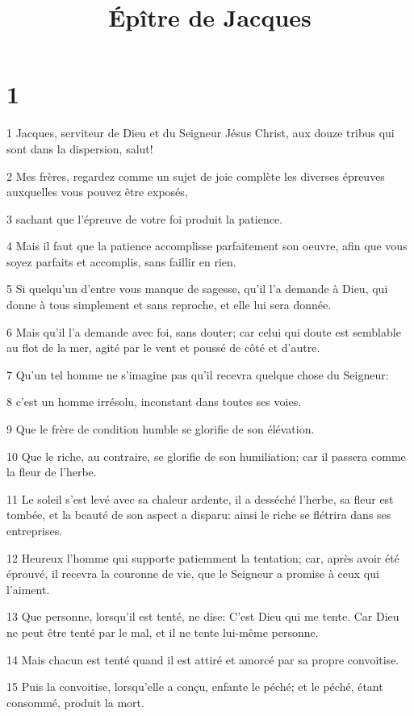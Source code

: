 

\title{Épître de Jacques}


\chapter{1}

\par 1 Jacques, serviteur de Dieu et du Seigneur Jésus Christ, aux douze tribus qui sont dans la dispersion, salut!
\par 2 Mes frères, regardez comme un sujet de joie complète les diverses épreuves auxquelles vous pouvez être exposés,
\par 3 sachant que l'épreuve de votre foi produit la patience.
\par 4 Mais il faut que la patience accomplisse parfaitement son oeuvre, afin que vous soyez parfaits et accomplis, sans faillir en rien.
\par 5 Si quelqu'un d'entre vous manque de sagesse, qu'il l'a demande à Dieu, qui donne à tous simplement et sans reproche, et elle lui sera donnée.
\par 6 Mais qu'il l'a demande avec foi, sans douter; car celui qui doute est semblable au flot de la mer, agité par le vent et poussé de côté et d'autre.
\par 7 Qu'un tel homme ne s'imagine pas qu'il recevra quelque chose du Seigneur:
\par 8 c'est un homme irrésolu, inconstant dans toutes ses voies.
\par 9 Que le frère de condition humble se glorifie de son élévation.
\par 10 Que le riche, au contraire, se glorifie de son humiliation; car il passera comme la fleur de l'herbe.
\par 11 Le soleil s'est levé avec sa chaleur ardente, il a desséché l'herbe, sa fleur est tombée, et la beauté de son aspect a disparu: ainsi le riche se flétrira dans ses entreprises.
\par 12 Heureux l'homme qui supporte patiemment la tentation; car, après avoir été éprouvé, il recevra la couronne de vie, que le Seigneur a promise à ceux qui l'aiment.
\par 13 Que personne, lorsqu'il est tenté, ne dise: C'est Dieu qui me tente. Car Dieu ne peut être tenté par le mal, et il ne tente lui-même personne.
\par 14 Mais chacun est tenté quand il est attiré et amorcé par sa propre convoitise.
\par 15 Puis la convoitise, lorsqu'elle a conçu, enfante le péché; et le péché, étant consommé, produit la mort.
